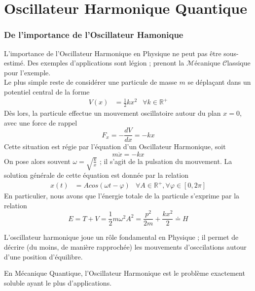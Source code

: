 \documentclass[../Notesdecours.tex]{subfiles}
\begin{document}
\part{Oscillateur Harmonique Quantique}
\section{De l'importance de l'Oscillateur Hamonique}
L'importance de l'Oscillateur Harmonique en Physique ne peut pas être sous-estimé. Des exemples d'applications sont légion ; prenont la $\mathcal{M}$écanique $\mathcal{C}$lassique pour l'exemple.\\

Le plus simple reste de considérer une particule de masse $m$ se déplaçant dans un potentiel central de la forme 
\begin{align}
    V(x) &= \frac{1}{2}kx^2     &\forall k\in\mathbb{R^+}
\end{align}
Dès lors, la particule effectue un mouvement oscillatoire autour du plan $x = 0$, avec une force de rappel 
\begin{equation}
    F_x = -\frac{dV}{dx} = -kx
\end{equation}
Cette situation est régie par l'équation d'un Oscillateur Harmonique, soit
\begin{equation}
    m\ddot{x} = -kx
\end{equation}
On pose alors souvent $\omega = \sqrt{\frac{k}{x}}$ ; il s'agit de la pulsation du mouvement. La solution générale de cette équation est donnée par la relation 
\begin{align}
    x(t) &= Acos \left(\omega t-\varphi\right)       &\forall A\in\mathbb{R}^+,\forall\varphi\in [0,2\pi]
\end{align}
En particulier, nous avons que l'énergie totale de la particule s'exprime par la relation
\begin{equation}
    E = T+V = \frac{1}{2}m\omega^2A^2 = \frac{p^2}{2m}+\frac{kx^2}{2} \doteq H
\end{equation}

\begin{remark}
    L'oscillateur harmonique joue un rôle fondamental en Physique ; il permet de décrire (du moins, de manière rapprochée) les mouvements d'osccilations autour d'une position d'équilibre.
\end{remark}

\begin{remark}
    En Mécanique Quantique, l'Oscillateur Harmonique est le problème exactement soluble ayant le plus d'applications.
\end{remark}
\end{document}
